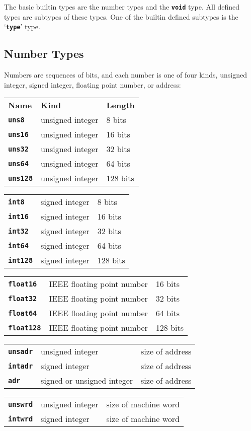\documentclass[12pt]{article}
\makeatletter
\newcommand{\TT}[1]{{\tt \bfseries #1}}
\newcommand{\ttkey}[1]{\TT{#1}\index{#1@{\tt #1}}}
\newenvironment{indpar}[1][0.3in]%
	{\begin{list}{}%
		     {\setlength{\itemsep}{0in}%
		      \setlength{\topsep}{0in}%
		      \setlength{\parsep}{1ex}%
		      \setlength{\labelwidth}{#1}%
		      \setlength{\leftmargin}{#1}%
		      \addtolength{\leftmargin}{\labelsep}}%
	 \item}%
	{\end{list}}
\makeatother
\begin{document}
The basic builtin types are the number types and the \TT{void} type.
All defined types are subtypes of these types.
One of the builtin defined subtypes is the `\TT{type}' type.

\subsection{Number Types}
\label{NUMBER-TYPES}

Numbers are sequences of bits, and each number is one of
four kinds, unsigned integer, signed integer, floating point number,
or address:

\begin{indpar}
\begin{tabular}{p{1in}@{~~~~~~}p{2in}@{~~~~~~}l}
\bf Name & \bf Kind & \bf Length \\[2ex]
\ttkey{uns8}		& unsigned integer & 8 bits \\
\ttkey{uns16}		& unsigned integer & 16 bits \\
\ttkey{uns32}		& unsigned integer & 32 bits \\
\ttkey{uns64}		& unsigned integer & 64 bits \\
\ttkey{uns128}		& unsigned integer & 128 bits
\end{tabular}

\begin{tabular}{p{1in}@{~~~~~~}p{2in}@{~~~~~~}l}
\ttkey{int8}		& signed integer & 8 bits \\
\ttkey{int16}		& signed integer & 16 bits \\
\ttkey{int32}		& signed integer & 32 bits \\
\ttkey{int64}		& signed integer & 64 bits \\
\ttkey{int128}		& signed integer & 128 bits
\end{tabular}

\begin{tabular}{p{1in}@{~~~~~~}p{2in}@{~~~~~~}l}
\ttkey{float16}		& IEEE floating point number & 16 bits \\
\ttkey{float32}		& IEEE floating point number & 32 bits \\
\ttkey{float64}		& IEEE floating point number & 64 bits \\
\ttkey{float128}	& IEEE floating point number & 128 bits
\end{tabular}

\begin{tabular}{p{1in}@{~~~~~~}p{2in}@{~~~~~~}l}
\ttkey{unsadr}		& unsigned integer & size of address \\
\ttkey{intadr}		& signed integer & size of address \\
\ttkey{adr}		& signed or unsigned integer & size of address \\
\end{tabular}

\begin{tabular}{p{1in}@{~~~~~~}p{2in}@{~~~~~~}l}
\ttkey{unswrd}		& unsigned integer & size of machine word \\
\ttkey{intwrd}		& signed integer & size of machine word \\
\end{tabular}
\end{indpar}
\end{document}

